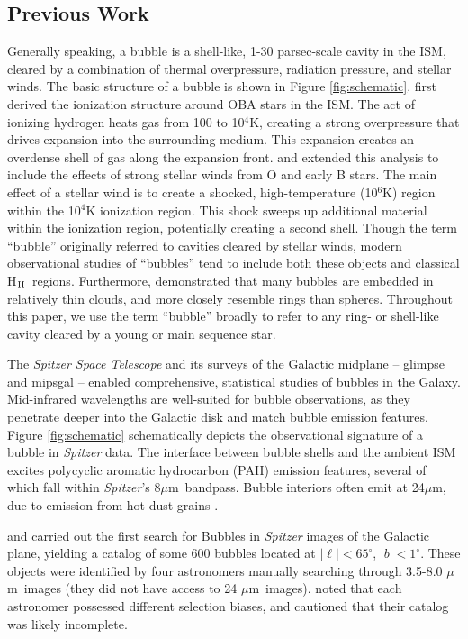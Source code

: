 \documentclass[preprint]{aastex}
\newcommand{\um}[0]{$\mu$m}
\newcommand{\hii}[0]{H$_{\rm II}$}
\begin{document}
\subsection{Previous Work}
\label{sec:previous}

Generally speaking, a bubble is a shell-like, 1-30 parsec-scale cavity in the ISM, cleared by a combination of thermal overpressure, radiation pressure, and stellar winds. The basic structure of a bubble is shown in Figure \ref{fig:schematic}. \cite{Stromgren39} first derived the ionization structure around OBA stars in the ISM. The act of ionizing hydrogen heats gas from 100 to 10$^4$K, creating a strong overpressure that drives expansion into the surrounding medium. This expansion creates an overdense shell of gas along the expansion front. \cite{Castor75} and \cite{Weaver77} extended this analysis to include the effects of strong stellar winds from O and early B stars. The main effect of a stellar wind is to create a shocked, high-temperature (10$^6$K) region within the 10$^4$K ionization region. This shock sweeps up additional material within the ionization region, potentially creating a second shell. Though the term ``bubble'' originally referred to cavities cleared by stellar winds, modern observational studies of ``bubbles'' tend to include both these objects and classical \hii\, regions. Furthermore, \cite{Beaumont10} demonstrated that many bubbles are embedded in relatively thin clouds, and more closely resemble rings than spheres. Throughout this paper, we use the term ``bubble'' broadly to refer to any ring- or shell-like cavity cleared by a young or main sequence star.

The \emph{Spitzer Space Telescope} and its surveys of the Galactic midplane -- {\sc glimpse} \citep{Benjamin03} and {\sc mipsgal} \citep{Carey09} -- enabled comprehensive, statistical studies of bubbles in the Galaxy. Mid-infrared wavelengths are well-suited for bubble observations, as they penetrate deeper into the Galactic disk and match bubble emission features. Figure \ref{fig:schematic} schematically depicts the observational signature of a bubble in \emph{Spitzer} data. The interface between bubble shells and the ambient ISM excites polycyclic aromatic hydrocarbon (PAH) emission features, several of which fall within \emph{Spitzer}'s 8\um\, bandpass. Bubble interiors often emit at 24\um, due to emission from hot dust grains \citep{Everett10}. 

\cite{Churchwell06} and \cite{Churchwell07} carried out the first search for Bubbles in \emph{Spitzer} images of the Galactic plane, yielding  a catalog of some 600 bubbles located at $|\ell| < 65^\circ$, $|b| < 1^\circ$. These objects were identified by four astronomers manually searching through 3.5-8.0 \um\, images (they did not have access to 24 \um\, images). \cite{Churchwell06} noted that each astronomer possessed different selection biases, and cautioned that their catalog was likely incomplete.
\end{document}
